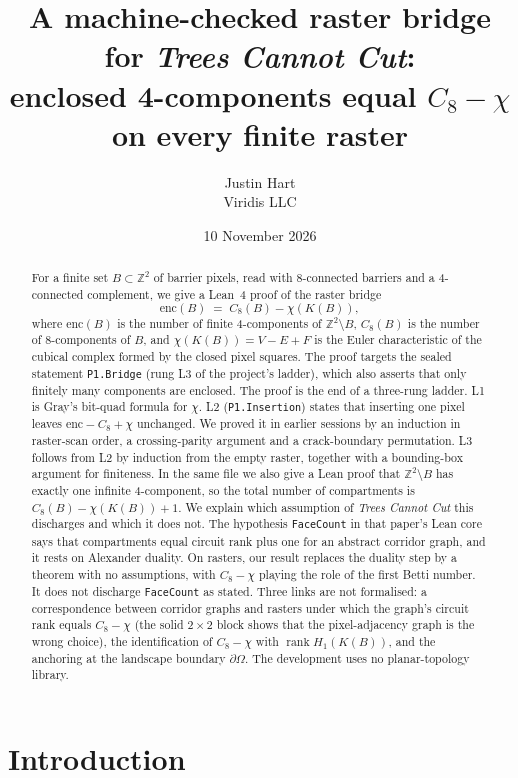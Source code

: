 \documentclass[11pt]{article}
\title{A machine-checked raster bridge for \emph{Trees Cannot Cut}:\\
enclosed 4-components equal $C_8-\chi$ on every finite raster}
\author{Justin Hart\\Viridis LLC}
\date{10 November 2026}
\theoremstyle{definition}
\theoremstyle{remark}
\begin{document}
\maketitle

\begin{abstract}
For a finite set $B\subset\mathbb{Z}^2$ of barrier pixels, read with 8-connected
barriers and a 4-connected complement, we give a Lean~4 proof of the raster bridge
\[
  \mathrm{enc}(B) \;=\; C_8(B)-\chi(K(B)),
\]
where $\mathrm{enc}(B)$ is the number of finite 4-components of $\mathbb{Z}^2\setminus B$,
$C_8(B)$ is the number of 8-components of $B$, and $\chi(K(B))=V-E+F$ is the Euler
characteristic of the cubical complex formed by the closed pixel squares. The proof
targets the sealed statement \texttt{P1.Bridge} (rung L3 of the project's ladder),
which also asserts that only finitely many components are enclosed. The proof is the
end of a three-rung ladder. L1 is Gray's bit-quad formula for $\chi$. L2
(\texttt{P1.Insertion}) states that inserting one pixel leaves
$\mathrm{enc}-C_8+\chi$ unchanged. We proved it in earlier sessions by an induction in
raster-scan order, a crossing-parity argument and a crack-boundary permutation. L3
follows from L2 by induction from the empty raster, together with a bounding-box
argument for finiteness. In the same file we also give a Lean proof that
$\mathbb{Z}^2\setminus B$ has exactly one infinite 4-component, so the total number of
compartments is $C_8(B)-\chi(K(B))+1$. We explain which assumption of \emph{Trees Cannot Cut}
this discharges and which it does not. The hypothesis \texttt{FaceCount} in that paper's
Lean core says that compartments equal circuit rank plus one for an abstract corridor
graph, and it rests on Alexander duality. On rasters, our result replaces the duality step
by a theorem with no assumptions, with $C_8-\chi$ playing the role of the first Betti number.
It does not discharge \texttt{FaceCount} as stated. Three links are not formalised: a
correspondence between corridor graphs and rasters under which the graph's circuit rank equals $C_8-\chi$
(the solid $2\times2$ block shows that the pixel-adjacency graph is the wrong
choice), the identification of $C_8-\chi$ with $\operatorname{rank}H_1(K(B))$, and the
anchoring at the landscape boundary $\partial\Omega$. The development uses no planar-topology library.
\end{abstract}

\section{Introduction}
\end{document}
